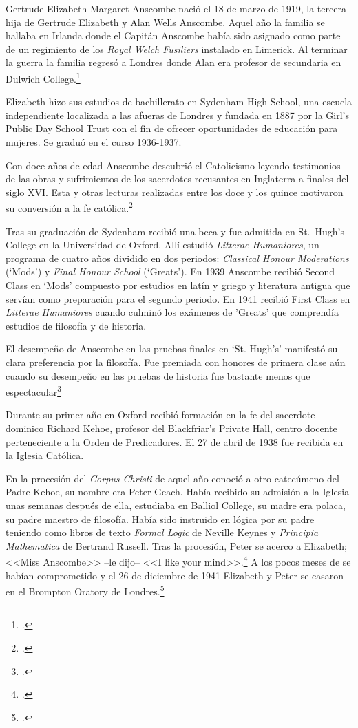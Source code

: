 Gertrude Elizabeth Margaret Anscombe nació el 18 de marzo de 1919, la tercera
  hija de Gertrude Elizabeth y Alan Wells Anscombe. Aquel año la familia se
  hallaba en Irlanda donde el Capitán Anscombe había sido asignado como parte de
  un regimiento de los \emph{Royal Welch Fusiliers} instalado en Limerick. Al
  terminar la guerra la familia regresó a Londres donde Alan era profesor de
  secundaria en Dulwich College.\footcite[cf.~][p.~31]{biofellows}

  Elizabeth hizo sus estudios de bachillerato en Sydenham High School, una escuela
  independiente localizada a las afueras de Londres y fundada en 1887 por la
  Girl's Public Day School Trust con el fin de ofrecer oportunidades de educación
  para mujeres. Se graduó en el curso 1936-1937.

  Con doce años de edad Anscombe descubrió el Catolicismo leyendo testimonios de
  las obras y sufrimientos de los sacerdotes recusantes en Inglaterra a finales
  del siglo XVI. Esta y otras lecturas realizadas entre los doce y los quince
  motivaron su conversión a la fe católica.\footcite[cf.~][p.~33]{biofellows}

  Tras su graduación de Sydenham recibió una beca y fue admitida en St.~Hugh's
  College en la Universidad de Oxford. Allí estudió \emph{Litterae Humaniores}, un
  programa de cuatro años dividido en dos periodos: \emph{Classical Honour
    Moderations} (`Mods') y \emph{Final Honour School} (`Greats'). En 1939
  Anscombe recibió Second Class en `Mods' compuesto por estudios en latín y griego
  y literatura antigua que servían como preparación para el segundo periodo. En
  1941 recibió First Class en \emph{Litterae Humaniores} cuando culminó los
  exámenes de 'Greats' que comprendía estudios de filosofía y de historia.

El desempeño de Anscombe en las
      pruebas finales en `St. Hugh's' manifestó su clara preferencia por la filosofía.
      Fue premiada con honores de primera clase aún cuando su desempeño en las pruebas
      de historia fue bastante menos que espectacular\footcite[p.~3~\S1]{teichmann}

  Durante su primer año en Oxford recibió formación en la fe del sacerdote
  dominico Richard Kehoe, profesor del Blackfriar's Private Hall, centro docente
  perteneciente a la Orden de Predicadores. El 27 de abril de 1938 fue recibida en
  la Iglesia Católica.

  En la procesión del \emph{Corpus Christi} de aquel año conoció a otro catecúmeno
  del Padre Kehoe, su nombre era Peter Geach. Había recibido su admisión a la
  Iglesia unas semanas después de ella, estudiaba en Balliol College, su madre era
  polaca, su padre maestro de filosofía. Había sido instruido en lógica por su
  padre teniendo como libros de texto \emph{Formal Logic} de Neville Keynes y
  \emph{Principia Mathematica} de Bertrand Russell. Tras la procesión, Peter se
  acerco a Elizabeth; <<Miss Anscombe>> --le dijo-- <<I like your
  mind>>.\footcite[cf.~][p.~187]{biofellowsxiv} A los pocos meses de se habían
  comprometido y el 26 de diciembre de 1941 Elizabeth y Peter se casaron en el
  Brompton Oratory de Londres.\footcite[cf.~][p.~33]{biofellows}

